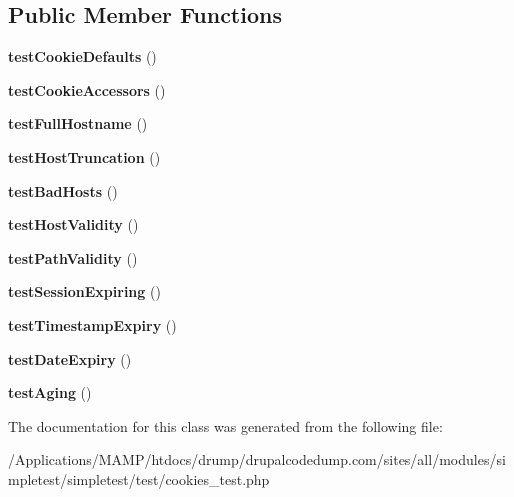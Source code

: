 \subsection*{Public Member Functions}
\begin{DoxyCompactItemize}
\item 
\hypertarget{class_test_of_cookie_af16c049ab73d543c72fcc449776b7ea5}{
{\bfseries testCookieDefaults} ()}
\label{class_test_of_cookie_af16c049ab73d543c72fcc449776b7ea5}

\item 
\hypertarget{class_test_of_cookie_ae4f66a7be739feac54f2ae9eb3c34b7d}{
{\bfseries testCookieAccessors} ()}
\label{class_test_of_cookie_ae4f66a7be739feac54f2ae9eb3c34b7d}

\item 
\hypertarget{class_test_of_cookie_a6b6fc79205bc793193127479fdc14490}{
{\bfseries testFullHostname} ()}
\label{class_test_of_cookie_a6b6fc79205bc793193127479fdc14490}

\item 
\hypertarget{class_test_of_cookie_a3b99addd62a073d9d1789fb571d458ca}{
{\bfseries testHostTruncation} ()}
\label{class_test_of_cookie_a3b99addd62a073d9d1789fb571d458ca}

\item 
\hypertarget{class_test_of_cookie_a9a18942b815524896fe87f1ef433f181}{
{\bfseries testBadHosts} ()}
\label{class_test_of_cookie_a9a18942b815524896fe87f1ef433f181}

\item 
\hypertarget{class_test_of_cookie_adab1a2243e1d81b53d1e9132d6b566f8}{
{\bfseries testHostValidity} ()}
\label{class_test_of_cookie_adab1a2243e1d81b53d1e9132d6b566f8}

\item 
\hypertarget{class_test_of_cookie_adaaccc44031dabb5f17e9110fb27feff}{
{\bfseries testPathValidity} ()}
\label{class_test_of_cookie_adaaccc44031dabb5f17e9110fb27feff}

\item 
\hypertarget{class_test_of_cookie_a6dc7afc42587e49f057363e52b027956}{
{\bfseries testSessionExpiring} ()}
\label{class_test_of_cookie_a6dc7afc42587e49f057363e52b027956}

\item 
\hypertarget{class_test_of_cookie_a141621911dfaeb5ec1405f25396a3cb8}{
{\bfseries testTimestampExpiry} ()}
\label{class_test_of_cookie_a141621911dfaeb5ec1405f25396a3cb8}

\item 
\hypertarget{class_test_of_cookie_a2a7146ffb1675bff150ebf0776d9b828}{
{\bfseries testDateExpiry} ()}
\label{class_test_of_cookie_a2a7146ffb1675bff150ebf0776d9b828}

\item 
\hypertarget{class_test_of_cookie_ade86ed7badc51dae4ba5fd79b9fe9dc6}{
{\bfseries testAging} ()}
\label{class_test_of_cookie_ade86ed7badc51dae4ba5fd79b9fe9dc6}

\end{DoxyCompactItemize}


The documentation for this class was generated from the following file:\begin{DoxyCompactItemize}
\item 
/Applications/MAMP/htdocs/drump/drupalcodedump.com/sites/all/modules/simpletest/simpletest/test/cookies\_\-test.php\end{DoxyCompactItemize}
